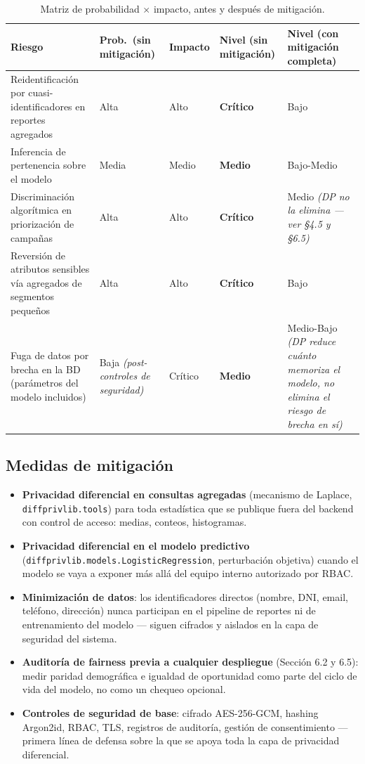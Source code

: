 \documentclass[11pt,a4paper]{article}
\begin{document}
\begin{table}[htbp]
\centering
\small
\begin{tabularx}{\textwidth}{@{}p{3.6cm}p{2cm}p{1.6cm}p{2.4cm}X@{}}
\toprule
\textbf{Riesgo} & \textbf{Prob.\ (sin mitigación)} & \textbf{Impacto} & \textbf{Nivel (sin
mitigación)} & \textbf{Nivel (con mitigación completa)} \\
\midrule
Reidentificación por cuasi-identificadores en reportes agregados & Alta & Alto & \textbf{Crítico}
& Bajo \\
Inferencia de pertenencia sobre el modelo & Media & Medio & \textbf{Medio} & Bajo-Medio \\
Discriminación algorítmica en priorización de campañas & Alta & Alto & \textbf{Crítico} & Medio
\emph{(DP no la elimina --- ver \S4.5 y \S6.5)} \\
Reversión de atributos sensibles vía agregados de segmentos pequeños & Alta & Alto &
\textbf{Crítico} & Bajo \\
Fuga de datos por brecha en la BD (parámetros del modelo incluidos) & Baja \emph{(post-controles
de seguridad)} & Crítico & \textbf{Medio} & Medio-Bajo \emph{(DP reduce cuánto memoriza el
modelo, no elimina el riesgo de brecha en sí)} \\
\bottomrule
\end{tabularx}
\caption{Matriz de probabilidad $\times$ impacto, antes y después de mitigación.}
\end{table}

\subsection{Medidas de mitigación}

\begin{itemize}[leftmargin=1.4em]
\item \textbf{Privacidad diferencial en consultas agregadas} (mecanismo de Laplace,
\texttt{diffprivlib.tools}) para toda estadística que se publique fuera del backend con control
de acceso: medias, conteos, histogramas.
\item \textbf{Privacidad diferencial en el modelo predictivo}
(\texttt{diffprivlib.models.LogisticRegression}, perturbación objetiva) cuando el modelo se vaya
a exponer más allá del equipo interno autorizado por RBAC.
\item \textbf{Minimización de datos}: los identificadores directos (nombre, DNI, email, teléfono,
dirección) nunca participan en el pipeline de reportes ni de entrenamiento del modelo --- siguen
cifrados y aislados en la capa de seguridad del sistema.
\item \textbf{Auditoría de fairness previa a cualquier despliegue} (Sección 6.2 y 6.5): medir
paridad demográfica e igualdad de oportunidad como parte del ciclo de vida del modelo, no como un
chequeo opcional.
\item \textbf{Controles de seguridad de base}: cifrado AES-256-GCM, hashing Argon2id, RBAC, TLS,
registros de auditoría, gestión de consentimiento --- primera línea de defensa sobre la que se
apoya toda la capa de privacidad diferencial.
\end{itemize}
\end{document}
